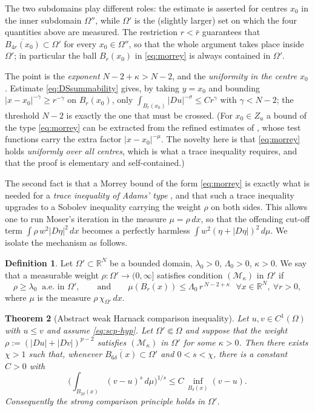 \documentclass[reqno]{amsart}
\theoremstyle{plain}
\newtheorem{theorem}{Theorem}
\theoremstyle{definition}
\newtheorem{definition}[theorem]{Definition}
\theoremstyle{remark}
\newcommand{\R}{\mathbb{R}}
\begin{document}
The two subdomains play different roles: the estimate is asserted for centres $x_0$ in the inner
subdomain $\Omega''$, while $\Omega'$ is the (slightly larger) set on which the four quantities above
are measured. The restriction $r<\bar r$ guarantees that
$\overline{B_{4r}(x_0)}\subset\Omega'$ for every $x_0\in\Omega''$, so that the whole argument takes
place inside $\Omega'$; in particular the ball $B_r(x_0)$ in \eqref{eq:morrey} is always contained in
$\Omega'$.

The point is the \emph{exponent} $N-2+\kappa>N-2$, and the \emph{uniformity in the centre $x_0$}.
Estimate \eqref{eq:DSsummability} gives, by taking $y=x_0$ and bounding $|x-x_0|^{-\gamma}\ge
r^{-\gamma}$ on $B_r(x_0)$, only
$\int_{B_r(x_0)}|Du|^{-\sigma}\le Cr^{\gamma}$ with $\gamma<N-2$; the threshold $N-2$ is exactly the
one that must be crossed. (For $x_0\in Z_u$ a bound of the type \eqref{eq:morrey} can be extracted
from the refined estimates of \cite{Sci2}, whose test functions carry the extra factor
$|x-x_0|^{-\mu}$. The novelty here is that \eqref{eq:morrey} holds \emph{uniformly over all
centres}, which is what a trace inequality requires, and that the proof is elementary and
self-contained.)

The second fact is that a Morrey bound of the form \eqref{eq:morrey} is exactly what is needed for a
\emph{trace inequality of Adams' type} \cite{Adams73,AdamsHedberg}, and that such a trace inequality
upgrades to a Sobolev inequality carrying the weight $\rho$ on both sides. This allows one to run
Moser's iteration in the measure $\mu=\rho\,dx$, so that the offending cut-off term
$\int\rho\,w^2|D\eta|^2\,dx$ becomes a perfectly harmless $\int w^2(\eta+|D\eta|)^2\,d\mu$. We
isolate the mechanism as follows.

\begin{definition}\label{def:Mkappa}
Let $\Omega'\subset\R^N$ be a bounded domain, $\lambda_0>0$, $\Lambda_0>0$, $\kappa>0$. We say that a
measurable weight $\rho:\Omega'\to(0,\infty]$ satisfies condition $(\mathcal M_\kappa)$ in $\Omega'$
if
\[
\rho\ge\lambda_0\ \text{ a.e. in }\Omega',\qquad\text{and}\qquad
\mu(B_r(x))\le \Lambda_0\, r^{\,N-2+\kappa}\ \ \ \forall x\in\R^N,\ \forall r>0 ,
\]
where $\mu$ is the measure $\rho\,\chi_{\Omega'}\,dx$.
\end{definition}

\begin{theorem}[Abstract weak Harnack comparison inequality]\label{thm:abstract}
Let $u,v\in C^1(\Omega)$ with $u\le v$ and assume \eqref{eq:scp-hyp}. Let $\Omega'\Subset\Omega$ and
suppose that the weight $\rho:=(|Du|+|Dv|)^{p-2}$ satisfies $(\mathcal M_\kappa)$ in $\Omega'$ for
some $\kappa>0$. Then there exists $\chi>1$ such that, whenever
$\overline{B_{6\delta}(x)}\subset\Omega'$ and $0<s<\chi$, there is a constant $C>0$ with
\[
\Big(\int_{B_{2\delta}(x)}(v-u)^s\,d\mu\Big)^{1/s}\le C\,\inf_{B_{\delta}(x)}(v-u).
\]
Consequently the strong comparison principle holds in $\Omega'$.
\end{theorem}
\end{document}
